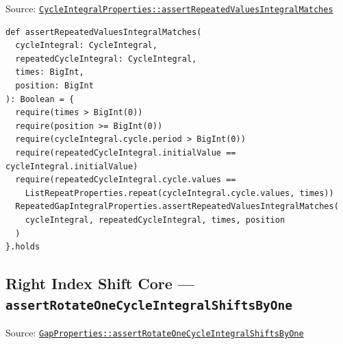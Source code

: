 {\raggedright Source: \href{https://github.com/thiagomata/prime-numbers/blob/integral-cycle-article-v1.0.0/src/main/scala/v1/chapter4/cycle/integral/recursive/properties/CycleIntegralProperties.scala}{\texttt{Cycle\allowbreak Integral\allowbreak Properties::assert\allowbreak Repeated\allowbreak Values\allowbreak Integral\allowbreak Matches}}\par}

\begin{lstlisting}[style=scala]
def assertRepeatedValuesIntegralMatches(
  cycleIntegral: CycleIntegral,
  repeatedCycleIntegral: CycleIntegral,
  times: BigInt,
  position: BigInt
): Boolean = {
  require(times > BigInt(0))
  require(position >= BigInt(0))
  require(cycleIntegral.cycle.period > BigInt(0))
  require(repeatedCycleIntegral.initialValue == cycleIntegral.initialValue)
  require(repeatedCycleIntegral.cycle.values ==
    ListRepeatProperties.repeat(cycleIntegral.cycle.values, times))
  RepeatedGapIntegralProperties.assertRepeatedValuesIntegralMatches(
    cycleIntegral, repeatedCycleIntegral, times, position
  )
}.holds
\end{lstlisting}

\subsection{Right Index Shift Core --- \texorpdfstring{\texttt{assert\allowbreak Rotate\allowbreak One\allowbreak Cycle\allowbreak Integral\allowbreak Shifts\allowbreak By\allowbreak One}}{assertRotateOneCycleIntegralShiftsByOne}}

{\raggedright Source: \href{https://github.com/thiagomata/prime-numbers/blob/integral-cycle-article-v1.0.0/src/main/scala/v1/chapter4/cycle/integral/recursive/properties/GapProperties.scala}{\texttt{Gap\allowbreak Properties::assert\allowbreak Rotate\allowbreak One\allowbreak Cycle\allowbreak Integral\allowbreak Shifts\allowbreak By\allowbreak One}}\par}

